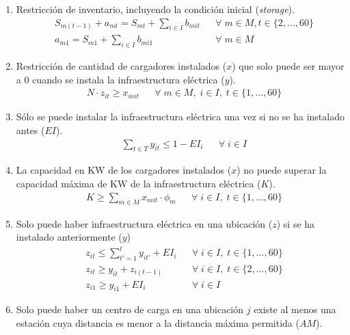 \documentclass[letterpaper]{article}
\begin{document}
\begin{flushleft}
	\begin{enumerate}
		\item Restricción de inventario, incluyendo la condici\'on inicial (\textit{storage}).
		      \begin{align*}
			       & S_{m(t-1)} + a_{mt} = S_{mt} + \sum_{i \in I} b_{mit} &  & \forall \; m \in M, t \in \{2, \ldots, 60\} \\
			       & a_{m1} = S_{m1} + \sum_{i \in I} b_{mi1}              &  & \forall \; m \in M
		      \end{align*}
		\item Restricción de cantidad de cargadores instalados ($x$) que solo puede ser mayor a $0$ cuando se instala la infraestructura eléctrica ($y$).
		      \begin{align*}
			       & N \cdot z_{it} \geq x_{mit} &  & \forall \; m \in M, \; i \in I,\; t \in \{1, \ldots, 60\}
		      \end{align*}
		\item S\'olo se puede instalar la infraestructura el\'ectrica una vez si no se ha instalado antes ($EI$).
		      \begin{align*}
			       & \sum_{t \in T} y_{it} \leq 1 - EI_i &  & \forall \; i \in I
		      \end{align*}
		\item La capacidad en KW de los cargadores instalados ($x$) no puede superar la capacidad m\'axima de KW de la infraestructura el\'ectrica ($K$).
		      \begin{align*}
			       & K \geq \sum_{m \in M} x_{mit} \cdot \phi_m &  & \forall \; i \in I, \; t \in \{1, \ldots, 60\}
		      \end{align*}
		\item Solo puede haber infraestructura el\'ectrica en una ubicaci\'on ($z$) si se ha instalado anteriormente ($y$)
		      \begin{align*}
			       & z_{it} \leq \sum_{t'=1}^{t} y_{it'} + EI_i &  & \forall \; i \in I, \; t \in \{1, \ldots, 60\} \\
			       & z_{it} \geq y_{it} + z_{i(t-1)}     		&  & \forall \; i \in I, \;t \in \{2, \ldots, 60\}  \\
			       & z_{i1} \geq y_{i1} + EI_i           		&  & \forall \; i \in I
		      \end{align*}
		\item Solo puede haber un centro de carga en una ubicaci\'on $j$ existe al menos una estaci\'on cuya distancia es menor a la distancia m\'axima permitida ($AM$).

\end{enumerate}
\end{flushleft}
\end{document}
